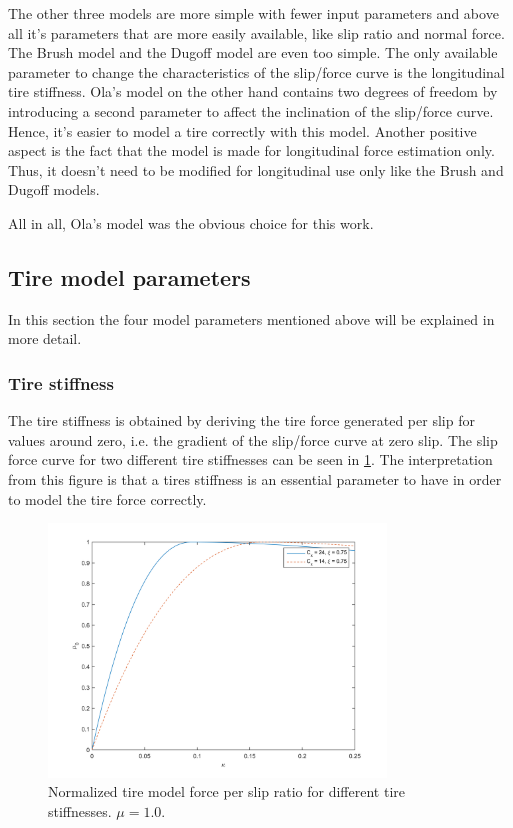 The other three models are more simple with fewer input parameters and above all it's parameters that are more easily available, like slip ratio and normal force. The Brush model and the Dugoff model are even too simple. The only available parameter to change the characteristics of the slip/force curve is the longitudinal tire stiffness. Ola's model on the other hand contains two degrees of freedom by introducing a second parameter to affect the inclination of the slip/force curve. Hence, it's easier to model a tire correctly with this model. Another positive aspect is the fact that the model is made for longitudinal force estimation only. Thus, it doesn't need to be modified for longitudinal use only like the Brush and Dugoff models. 

All in all, Ola's model was the obvious choice for this work.

\subsection{Tire model parameters}
In this section the four model parameters mentioned above will be explained in more detail.

\subsubsection{Tire stiffness}
The tire stiffness is obtained by deriving the tire force generated per slip for values around zero, i.e. the gradient of the slip/force curve at zero slip. The slip force curve for two different tire stiffnesses can be seen in \ref{different_cx}. The interpretation from this figure is that a tires stiffness is an essential parameter to have in order to model the tire force correctly. 

\begin{figure}[h]
	\centering
	\includegraphics[width=0.8\textwidth]{Pictures/slipkraft_olika_cx}
	\caption {Normalized tire model force per slip ratio for different tire stiffnesses. $ \mu = 1.0 $.}
	\label{different_cx}
\end{figure}

